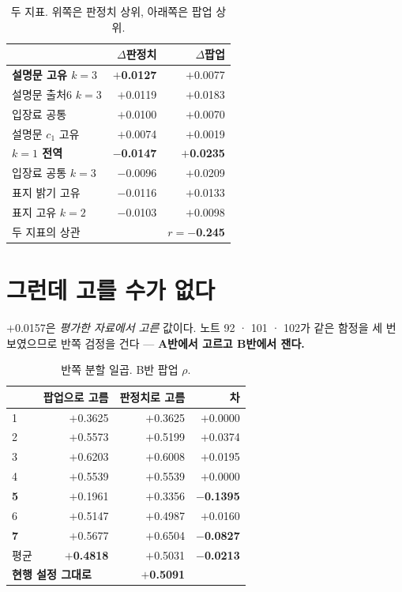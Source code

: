 \documentclass[10pt]{article}
\begin{document}
\begin{table}[t]
\centering\tsize
\caption{두 지표. 위쪽은 판정치 상위, 아래쪽은 팝업 상위.}
\begin{tabular}{lrr}
\toprule
& $\Delta$판정치 & $\Delta$팝업 \\
\midrule
\textbf{설명문 고유 $k{=}3$} & \textbf{$+$0.0127} & $+$0.0077 \\
설명문 출처6 $k{=}3$ & $+$0.0119 & $+$0.0183 \\
입장료 공통 & $+$0.0100 & $+$0.0070 \\
설명문 $c_1$ 고유 & $+$0.0074 & $+$0.0019 \\
\midrule
\textbf{$k{=}1$ 전역} & \textbf{$-$0.0147} & \textbf{$+$0.0235} \\
입장료 공통 $k{=}3$ & $-$0.0096 & $+$0.0209 \\
표지 밝기 고유 & $-$0.0116 & $+$0.0133 \\
표지 고유 $k{=}2$ & $-$0.0103 & $+$0.0098 \\
\midrule
\multicolumn{2}{l}{두 지표의 상관} & \textbf{$r{=}-$0.245} \\
\bottomrule
\end{tabular}
\end{table}


\section{그런데 고를 수가 없다}

$+$0.0157은 \emph{평가한 자료에서 고른} 값이다. 노트 92 · 101 · 102가 같은
함정을 세 번 보였으므로 반쪽 검정을 건다 --- \textbf{A반에서 고르고 B반에서
잰다.}

\begin{table}[t]
\centering\tsize
\caption{반쪽 분할 일곱. B반 팝업 $\rho$.}
\begin{tabular}{lrrr}
\toprule
& 팝업으로 고름 & 판정치로 고름 & 차 \\
\midrule
1 & $+$0.3625 & $+$0.3625 & $+$0.0000 \\
2 & $+$0.5573 & $+$0.5199 & $+$0.0374 \\
3 & $+$0.6203 & $+$0.6008 & $+$0.0195 \\
4 & $+$0.5539 & $+$0.5539 & $+$0.0000 \\
\textbf{5} & $+$0.1961 & $+$0.3356 & \textbf{$-$0.1395} \\
6 & $+$0.5147 & $+$0.4987 & $+$0.0160 \\
\textbf{7} & $+$0.5677 & $+$0.6504 & \textbf{$-$0.0827} \\
\midrule
평균 & \textbf{$+$0.4818} & $+$0.5031 & \textbf{$-$0.0213} \\
\midrule
\multicolumn{2}{l}{\textbf{현행 설정 그대로}} & \textbf{$+$0.5091} & \\
\bottomrule
\end{tabular}
\end{table}
\end{document}
